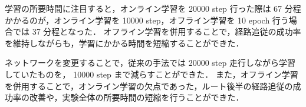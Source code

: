 学習の所要時間に注目すると，オンライン学習を 20000 step 行った際は 67 分程かかるのが，オンライン学習を 10000 step，オフライン学習を 10 epoch 行う場合では 37 分程となった．
オフライン学習を併用することで，経路追従の成功率を維持しながらも，学習にかかる時間を短縮することができた．

ネットワークを変更することで，従来の手法では 20000 step 走行しながら学習していたものを， 10000 step まで減らすことができた．
また，オフライン学習を併用することで，オンライン学習の欠点であった，ルート後半の経路追従の成功率の改善や，実験全体の所要時間の短縮を行うことができた．